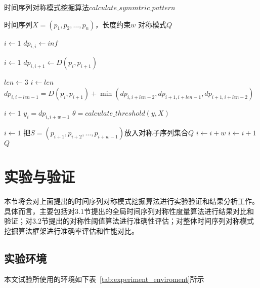 \begin{algorithm}
  \caption{时间序列对称模式挖掘算法$calculate\_symmtric\_pattern$}
  \label{alg:symmetric_pattern}
  \small
  \begin{algorithmic}
    \REQUIRE 时间序列$X=\left(p_{1}, p_{2}, \dots, p_{n}\right)$，长度约束$w$
    \ENSURE 对称模式$Q$

    \STATE $i \leftarrow 1$
    \STATE $dp_{i,i} \leftarrow inf$
    \ENDWHILE

    \STATE $i \leftarrow 1$
    \STATE $dp_{i,i+1} \leftarrow D\left(p_{i}, p_{i+1}\right)$
    \ENDWHILE

    \STATE $len \leftarrow 3$
    \STATE $i \leftarrow len$
    \STATE $dp_{i,i+len-1} = D\left(p_{i}, p_{i+1}\right)+\min \left(dp_{i,i+len-2},dp_{i+1,i+len-1},dp_{i+1,i+len-2}\right)$
    \ENDWHILE
    \ENDWHILE

    \STATE $i \leftarrow 1$
    \STATE $y_i=dp_{i,i+w-1}$
    \ENDWHILE
    \STATE $\theta = calculate\_threshold\left(y,X\right)$

    \STATE $i \leftarrow 1$
    \STATE 把$S=\left(p_{i+1}, p_{i+2}, \dots, p_{i+w-1}\right)$放入对称子序列集合$Q$
    \STATE $i \leftarrow i+w$
    \ELSE
    \STATE $i \leftarrow i+1$
    \ENDIF
    \ENDWHILE
    \RETURN $Q$
  \end{algorithmic}
\end{algorithm}

\section{实验与验证}
本节将会对上面提出的时间序列对称模式挖掘算法进行实验验证和结果分析工作。具体而言，主要包括对3.1节提出的全局时间序列对称性度量算法进行结果对比和验证；对3.2节提出的对称性阈值算法进行准确性评估；对整体时间序列对称模式挖掘算法框架进行准确率评估和性能对比。
\subsection{实验环境}
本文试验所使用的环境如下表~\ref{tab:experiment_enviroment}所示

